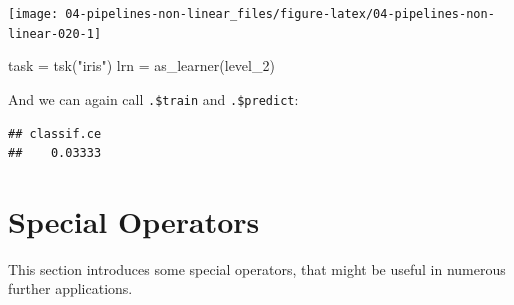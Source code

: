 \documentclass[
]{scrbook}
\newenvironment{Shaded}{\begin{snugshade}}{\end{snugshade}}
\newcommand{\AttributeTok}[1]{\textcolor[rgb]{0.77,0.63,0.00}{#1}}
\newcommand{\CommentTok}[1]{\textcolor[rgb]{0.56,0.35,0.01}{\textit{#1}}}
\newcommand{\ConstantTok}[1]{\textcolor[rgb]{0.00,0.00,0.00}{#1}}
\newcommand{\DecValTok}[1]{\textcolor[rgb]{0.00,0.00,0.81}{#1}}
\newcommand{\FunctionTok}[1]{\textcolor[rgb]{0.00,0.00,0.00}{#1}}
\newcommand{\NormalTok}[1]{#1}
\newcommand{\OtherTok}[1]{\textcolor[rgb]{0.56,0.35,0.01}{#1}}
\newcommand{\SpecialCharTok}[1]{\textcolor[rgb]{0.00,0.00,0.00}{#1}}
\newcommand{\StringTok}[1]{\textcolor[rgb]{0.31,0.60,0.02}{#1}}
\renewenvironment{Shaded} {\begin{snugshade}\small} {\end{snugshade}}
\begin{document}
\begin{Shaded}
\end{Shaded}

\begin{center}\texttt{[image: 04-pipelines-non-linear\_files/figure-latex/04-pipelines-non-linear-020-1]} \end{center}

\begin{Shaded}
\begin{Highlighting}[]
\NormalTok{task }\OtherTok{=} \FunctionTok{tsk}\NormalTok{(}\StringTok{"iris"}\NormalTok{)}
\NormalTok{lrn }\OtherTok{=} \FunctionTok{as\_learner}\NormalTok{(level\_2)}
\end{Highlighting}
\end{Shaded}

And we can again call \texttt{.\$train} and \texttt{.\$predict}:

\begin{Shaded}
\end{Shaded}

\begin{verbatim}
## classif.ce 
##    0.03333
\end{verbatim}

\hypertarget{pipe-special-ops}{%
\section{Special Operators}\label{pipe-special-ops}}

This section introduces some special operators, that might be useful in numerous further applications.
\end{document}
